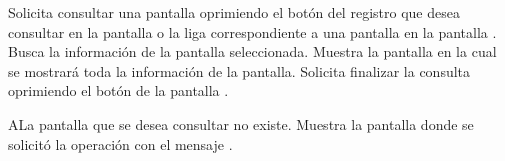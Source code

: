  \begin{UCtrayectoria}
    \UCpaso[\UCactor] Solicita consultar una pantalla oprimiendo el botón \btnConsulta del registro que desea consultar en la pantalla  o la liga correspondiente a una pantalla en la pantalla .
    \UCpaso[\UCsist] Busca la información de la pantalla seleccionada.  %
    \UCpaso[\UCsist] Muestra la pantalla  en la cual se mostrará toda la información de la pantalla.
    \UCpaso[\UCactor] Solicita finalizar la consulta oprimiendo el botón  de la pantalla .
 \end{UCtrayectoria}
 
 \begin{UCtrayectoriaA}{A}{La pantalla que se desea consultar no existe.}
    \UCpaso[\UCsist] Muestra la pantalla donde se solicitó la operación con el mensaje .
 \end{UCtrayectoriaA} 
  